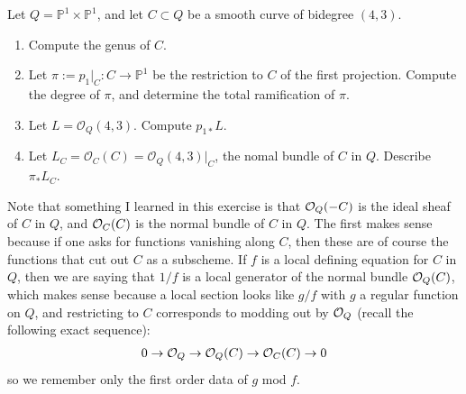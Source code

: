 \documentclass[12pt]{article}
\begin{document}
\begin{exercise}
    Let \(Q=\mathbb P^1\times \mathbb P^1\), and let \(C\subset Q\) be a smooth curve of bidegree \((4,3)\).

    \begin{enumerate}
        \item Compute the genus of \(C\).

        \item Let $\pi := p_1|_C : C \to \mathbb P^1$
              be the restriction to \(C\) of the first projection. Compute the degree of \(\pi\), and determine the total ramification of \(\pi\).

        \item Let \(L=\mathcal O_Q(4,3)\). Compute \(p_{1*}L\).

        \item Let \(L_C=\mathcal O_C(C)=\mathcal O_Q(4,3)|_C\), the nomal bundle of \(C\) in \(Q\).
              Describe \(\pi_*L_C\).
    \end{enumerate}
\end{exercise}

Note that something I learned in this exercise is that ${\mathcal{O}}_Q(-C)$ is the ideal sheaf of $C$ in $Q$, and ${\mathcal{O}}_C(C)$ is the normal bundle of $C$ in $Q$. The first makes sense because if one asks for functions vanishing along $C$, then these are of course the functions that cut out $C$ as a subscheme. If $f$ is a local defining equation for $C$ in $Q$, then we are saying that $1/f$ is a local generator of the normal bundle ${\mathcal{O}}_Q(C)$, which makes sense because a local section looks like $g/f$ with $g$ a regular function on $Q$, and restricting to $C$ corresponds to modding out by ${\mathcal{O}}_Q$ (recall the following exact sequence):
\begin{align*}
    0\to {\mathcal{O}}_Q \to {\mathcal{O}}_Q(C)\to {\mathcal{O}}_C(C)\to 0
\end{align*}
so we remember only the first order data of $g$ mod $f$.
\end{document}
